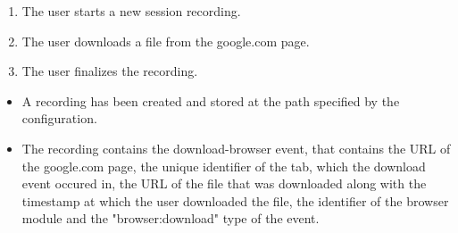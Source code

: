 \begin{tests}
	
	{\begin{enumerate}
		\item The \gls{user} starts a new \gls{session} recording.
		\item The \gls{user} downloads a file from the google.com page.
		\item The \gls{user} finalizes the recording.
	\end{enumerate}}
	{\begin{itemize}
		\item A recording has been created and stored at the path specified by the configuration.
		\item The recording contains the download-browser \gls{event},  that contains the URL of the google.com page, the unique identifier of the tab, which the download \gls{event} occured in, the URL of the file that was downloaded along with the timestamp at which the \gls{user} downloaded the file, the identifier of the \gls{browser} module and the "browser:download" type of the event.
	\end{itemize}}
	
\end{tests}

